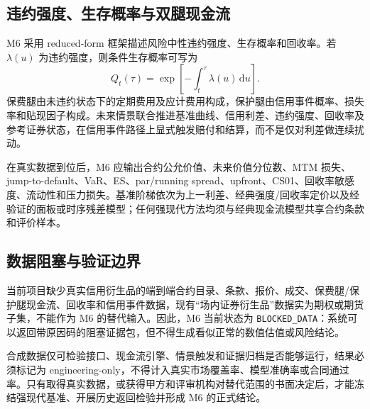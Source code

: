 \subsection{违约强度、生存概率与双腿现金流}

M6 采用 reduced-form 框架描述风险中性违约强度、生存概率和回收率\cite{duffie_singleton_1999}。若 \(\lambda(u)\) 为违约强度，则条件生存概率可写为
\begin{equation}
  Q_t(\tau)=\exp\!\left[-\int_t^{\tau}\lambda(u)\,\mathrm du\right].
\end{equation}
保费腿由未违约状态下的定期费用及应计费用构成，保护腿由信用事件概率、损失率和贴现因子构成。未来情景联合推进基准曲线、信用利差、违约强度、回收率及参考证券状态，在信用事件路径上显式触发赔付和结算，而不是仅对利差做连续扰动。

在真实数据到位后，M6 应输出合约公允价值、未来价值分位数、MTM 损失、jump-to-default、VaR、ES、par/running spread、upfront、CS01、回收率敏感度、流动性和压力损失。基准阶梯依次为上一利差、经典强度/回收率定价以及经验证的面板或时序残差模型；任何强现代方法均须与经典现金流模型共享合约条款和评价样本。

\subsection{数据阻塞与验证边界}

当前项目缺少真实信用衍生品的端到端合约目录、条款、报价、成交、保费腿/保护腿现金流、回收率和信用事件数据，现有“场内证券衍生品”数据实为期权或期货子集，不能作为 M6 的替代输入。因此，M6 当前状态为 \texttt{BLOCKED\_DATA}：系统可以返回带原因码的阻塞证据包，但不得生成看似正常的数值估值或风险结论。

合成数据仅可检验接口、现金流引擎、情景触发和证据归档是否能够运行，结果必须标记为 engineering-only，不得计入真实市场覆盖率、模型准确率或合同通过率。只有取得真实数据，或获得甲方和评审机构对替代范围的书面决定后，才能冻结强现代基准、开展历史返回检验并形成 M6 的正式结论。

